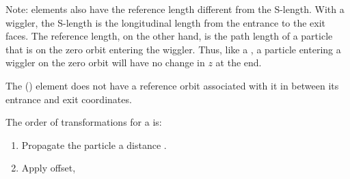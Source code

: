 Note:  elements also have the reference length different
from the S-length. With a wiggler, the S-length is the longitudinal
length from the entrance to the exit faces. The reference length, on
the other hand, is the path length of a particle that is on the zero
orbit entering the wiggler. Thus, like a , a particle
entering a wiggler on the zero orbit will have no change in $z$ at the
end.


The  () element does not have a
reference orbit associated with it in between its entrance and exit
coordinates.


The order of transformations for a  is:
\begin{enumerate}
\item
Propagate the particle a distance . 
\item
Apply offset, 
\end{enumerate}


